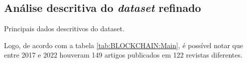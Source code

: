 \subsection{Análise descritiva do \textit{dataset} refinado}

\begin{table}[]
    \centering
{}
    \caption{Principais dados descritivos do dataset.}
    \label{tab:BLOCKCHAIN:Main}
\end{table}

Logo, de acordo com a tabela \ref{tab:BLOCKCHAIN:Main}, é possível notar que entre 2017 e 2022 houveram 149 artigos publicados em 122 revistas diferentes.